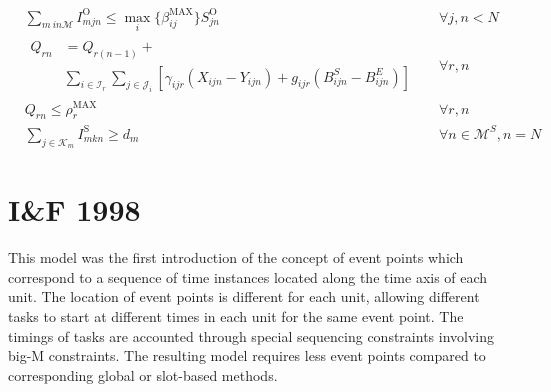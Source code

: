 \begin{align}
&\sum_{m \ in \mathcal{M}} I_{mjn}^\text{O} \le \max_i \{\beta_{ij}^{\text{MAX}}\} S_{jn}^\text{O} && \forall j, n < N \\
&\begin{aligned}
Q_{rn} &= Q_{r(n-1)} +\\ &\sum_{i \in \mathcal{I}_r} \sum_{j \in \mathcal{J}_i} [\gamma_{ijr} (X_{ijn} - Y_{ijn}) + g_{ijr} (B_{ijn}^S - B_{ijn}^E)] 
\end{aligned}&& \forall r, n \\
&Q_{rn} \le \rho_r^\text{MAX} &&\forall r, n \\
&\sum_{j \in \mathcal{K}_m} I_{mkn}^\text{S} \ge d_m &&\forall n \in \mathcal{M}^S, n = N
\end{align}

\section{I\&F 1998}
This model \citep{Ierapetritou} was the first introduction of the concept of event points which correspond to a sequence of time instances located along the time axis of each unit. The location of event points is different for each unit, allowing different tasks to start at different times in each unit for the same event point. The timings of tasks are accounted through special sequencing constraints involving big-M constraints. The resulting model requires less event points compared to corresponding global or slot-based methods. 
